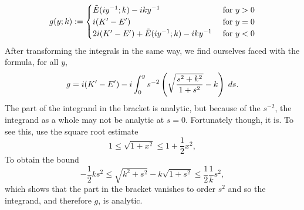 \[
g(y;k) :=
\begin{cases}
\tilde E(i y^{-1}; k) - i ky^{-1}             & \text{ for } y > 0 \\
i (K'-E')                                       & \text{ for } y = 0 \\
2i (K'-E') + \tilde E(i y^{-1}; k)  - i ky^{-1}  & \text{ for } y < 0
\end{cases}
\]
After transforming the integrals in the same way, we find ourselves faced with the formula, for all $y$,
\[
g = i (K'-E') - i \int_0^y s^{-2}\left( \sqrt{\frac{s^2 + k^2}{1 + s^2}} - k \right)\;ds.
\]
The part of the integrand in the bracket is analytic, but because of the $s^{-2}$, the integrand as a whole may not be analytic at $s=0$. Fortunately though, it is. To see this, use the square root estimate
\[
1 \leq \sqrt {1 + x^2} \leq 1 + \frac{1}{2}x^2,
\]
To obtain the bound
\[
-\frac{1}{2}k s^2 \leq \sqrt{k^2 + s^2} - k \sqrt{1+s^2} \leq \frac{1}{2}\frac{1}{k} s^2,
\]
which shows that the part in the bracket vanishes to order $s^2$ and so the integrand, and therefore $g$, is analytic.

